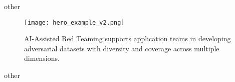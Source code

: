 other\begin{figure}[h!tbp]
    \texttt{[image: hero\_example\_v2.png]}
    \caption{AI-Assisted Red Teaming supports application teams in developing adversarial datasets with diversity and coverage across multiple dimensions.}
    \label{fig:prompt}
\end{figure}other